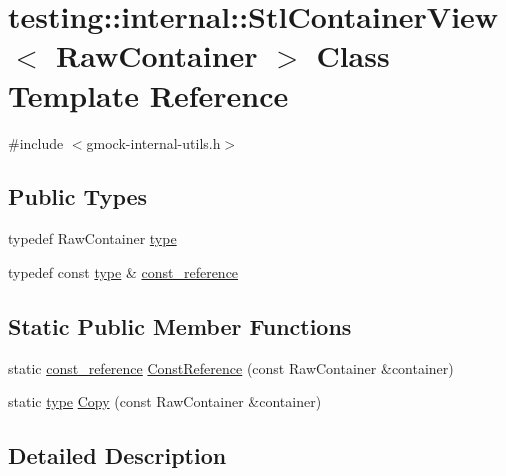 \hypertarget{classtesting_1_1internal_1_1_stl_container_view}{}\section{testing\+:\+:internal\+:\+:Stl\+Container\+View$<$ Raw\+Container $>$ Class Template Reference}
\label{classtesting_1_1internal_1_1_stl_container_view}


{\ttfamily \#include $<$gmock-\/internal-\/utils.\+h$>$}

\subsection*{Public Types}
\begin{DoxyCompactItemize}
\item 
typedef Raw\+Container \hyperlink{classtesting_1_1internal_1_1_stl_container_view_a2b2c63a6dcdbfe63fb0ee121ebf463ba}{type}
\item 
typedef const \hyperlink{classtesting_1_1internal_1_1_stl_container_view_a2b2c63a6dcdbfe63fb0ee121ebf463ba}{type} \& \hyperlink{classtesting_1_1internal_1_1_stl_container_view_a9cd4f6ed689b3938cdb7b3c4cbf1b36b}{const\+\_\+reference}
\end{DoxyCompactItemize}
\subsection*{Static Public Member Functions}
\begin{DoxyCompactItemize}
\item 
static \hyperlink{classtesting_1_1internal_1_1_stl_container_view_a9cd4f6ed689b3938cdb7b3c4cbf1b36b}{const\+\_\+reference} \hyperlink{classtesting_1_1internal_1_1_stl_container_view_a36eccf53329730f6e55c12002128bf25}{Const\+Reference} (const Raw\+Container \&container)
\item 
static \hyperlink{classtesting_1_1internal_1_1_stl_container_view_a2b2c63a6dcdbfe63fb0ee121ebf463ba}{type} \hyperlink{classtesting_1_1internal_1_1_stl_container_view_a441123838221f1284873f66ed968f279}{Copy} (const Raw\+Container \&container)
\end{DoxyCompactItemize}


\subsection{Detailed Description}
